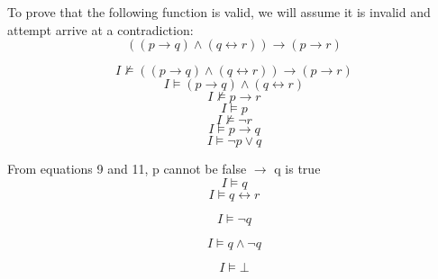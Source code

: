 \documentclass[11pt]{article}
\begin{document}
\begin{enumerate}
To prove that the following function is valid, we will assume it is invalid and attempt arrive at a contradiction:
\begin{equation}
((p \rightarrow q) \land (q \leftrightarrow  r)) \rightarrow (p  \rightarrow r)
\end{equation}

\begin{equation}
 I \nvDash ((p \rightarrow q) \land (q \leftrightarrow  r)) \rightarrow (p  \rightarrow r)
\end{equation}
\begin{equation}
 I \vDash (p \rightarrow q) \land (q \leftrightarrow  r)
\end{equation}
\begin{equation}
 I \nvDash p \rightarrow r
\end{equation}
\begin{equation}
  I \vDash p 
\end{equation}
\begin{equation}
  I \nvDash \neg r
\end{equation}
\begin{equation}
  I \vDash p \rightarrow  q
\end{equation}
\begin{equation}
  I \vDash \neg p \lor q
\end{equation}

From equations 9 and 11, p cannot be false $\rightarrow$ q is true
\begin{equation}
  I \vDash q
\end{equation}
\begin{equation}
  I \vDash q \leftrightarrow r 
\end{equation}

\begin{equation}
  I \vDash \neg q
\end{equation}

\begin{equation}
  I \vDash  q \land \neg q 
\end{equation}

\begin{equation}
  I \vDash \bot 
\end{equation}


\newline 


\end{enumerate}
\end{document}
